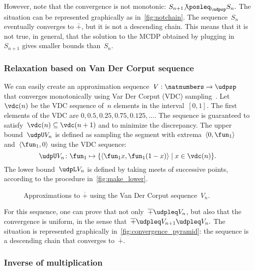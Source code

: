 However, note that the convergence is not monotonic: $S_{n+1}{\not\posleq}_{\udpsp}S_{n}.$
The situation can be represented graphically as in~\cref{fig:notchain}.
The sequence~$S_{n}$ eventually converges to $\overline{+}$, but
it is not a descending chain. This means that it is not true, in general,
that the solution to the MCDP obtained by plugging in~$S_{n+1}$
gives smaller bounds than~$S_{n}$.

\subsubsection*{Relaxation based on Van Der Corput sequence}

We can easily create an approximation sequence~$V:\natnumbers\to\udpsp$
that converges monotonically using Var Der Corput (VDC) sampling~\cite[Section 5.2]{LaValle2006Planning}.
Let~$\vdc(n)$ be the VDC sequence of~$n$ elements in the interval~$[0,1]$.
The first elements of the VDC are $0,0.5,0.25,0.75,0.125,\dots$.
The sequence is guaranteed to satisfy~$\vdc(n)\subseteq\vdc(n+1)$
and to minimize the discrepancy. The upper bound~$\udpU V_{n}$
is defined as sampling the segment with extrema~$\left\langle 0,\fun_{1}\right\rangle $
and~$\left\langle \fun_{1},0\right\rangle $ using the VDC sequence:
\[
  \udpU V_{n}\colon\fun_{1}\mapsto\{\left\langle \fun_{1}x,\fun_{1}(1-x)\right\rangle \mid x\in\vdc(n)\}.
\]
The lower bound~$\udpL V_{n}$ is defined by taking meets of successive
points, according to the procedure in~\cref{fig:make_lower}.
\begin{center}
  \begin{figure}[h]
    \begin{centering}
      \par
    \end{centering}
    \caption{\label{fig:Vn}Approximations to $\overline{+}$ using the Van Der
    Corput sequence~$V_{n}$.}
  \end{figure}
  \par
\end{center}

For this sequence, one can prove that not only~$\overline{+}\udpleq V_{n}$,
but also that the convergence is uniform, in the sense that~$\overline{+}\udpleq V_{n+1}\udpleq V_{n}.$
The situation is represented graphically in~\cref{fig:convergence_pyramid}:
the sequence is a descending chain that converges to~$\overline{+}$.

\subsubsection{Inverse of multiplication}

